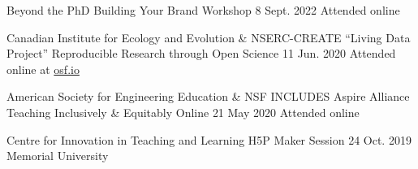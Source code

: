 \begin{cventries}
  \cventry
    {Beyond the PhD} %
    {Building Your Brand Workshop} %
    {8 Sept. 2022} %
    {Attended online} %
    {
    }


  \cventry
    {Canadian Institute for Ecology and Evolution \& NSERC-CREATE ``Living Data Project''} %
    {Reproducible Research through Open Science} %
    {11 Jun. 2020} %
    {Attended online at \href{https://osf.io/p7r5d/}{osf.io}} %
    {
    }

  \cventry
    {American Society for Engineering Education \& NSF INCLUDES Aspire Alliance} %
    {Teaching Inclusively \& Equitably Online} %
    {21 May 2020} %
    {Attended online} %
    {
    }

  \cventry
    {Centre for Innovation in Teaching and Learning} %
    {H5P Maker Session} %
    {24 Oct. 2019} %
    {Memorial University} %
    {
    }


\end{cventries}

